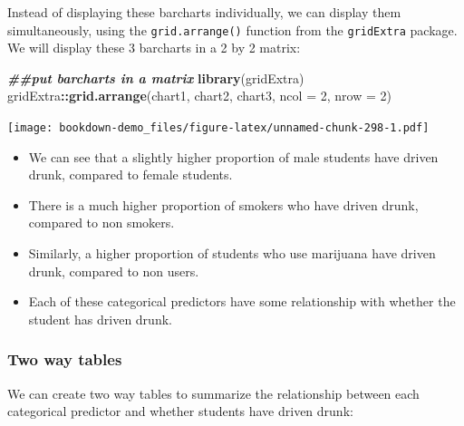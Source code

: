 \documentclass[
]{book}
\newenvironment{Shaded}{\begin{snugshade}}{\end{snugshade}}
\newcommand{\AttributeTok}[1]{\textcolor[rgb]{0.13,0.29,0.53}{#1}}
\newcommand{\DecValTok}[1]{\textcolor[rgb]{0.00,0.00,0.81}{#1}}
\newcommand{\DocumentationTok}[1]{\textcolor[rgb]{0.56,0.35,0.01}{\textbf{\textit{#1}}}}
\newcommand{\FunctionTok}[1]{\textcolor[rgb]{0.13,0.29,0.53}{\textbf{#1}}}
\newcommand{\NormalTok}[1]{#1}
\newcommand{\SpecialCharTok}[1]{\textcolor[rgb]{0.81,0.36,0.00}{\textbf{#1}}}
\providecommand{\tightlist}{%
  \setlength{\itemsep}{0pt}\setlength{\parskip}{0pt}}
\begin{document}
Instead of displaying these barcharts individually, we can display them simultaneously, using the \texttt{grid.arrange()} function from the \texttt{gridExtra} package. We will display these 3 barcharts in a 2 by 2 matrix:

\begin{Shaded}
\begin{Highlighting}[]
\DocumentationTok{\#\#put barcharts in a matrix}
\FunctionTok{library}\NormalTok{(gridExtra)}
\NormalTok{gridExtra}\SpecialCharTok{::}\FunctionTok{grid.arrange}\NormalTok{(chart1, chart2, chart3, }\AttributeTok{ncol =} \DecValTok{2}\NormalTok{, }\AttributeTok{nrow =} \DecValTok{2}\NormalTok{)}
\end{Highlighting}
\end{Shaded}

\texttt{[image: bookdown-demo\_files/figure-latex/unnamed-chunk-298-1.pdf]}

\begin{itemize}
\tightlist
\item
  We can see that a slightly higher proportion of male students have driven drunk, compared to female students.
\item
  There is a much higher proportion of smokers who have driven drunk, compared to non smokers.
\item
  Similarly, a higher proportion of students who use marijuana have driven drunk, compared to non users.
\item
  Each of these categorical predictors have some relationship with whether the student has driven drunk.
\end{itemize}

\hypertarget{two-way-tables-1}{%
\subsubsection*{Two way tables}\label{two-way-tables-1}}

We can create two way tables to summarize the relationship between each categorical predictor and whether students have driven drunk:

\begin{Shaded}
\end{Shaded}
\end{document}
